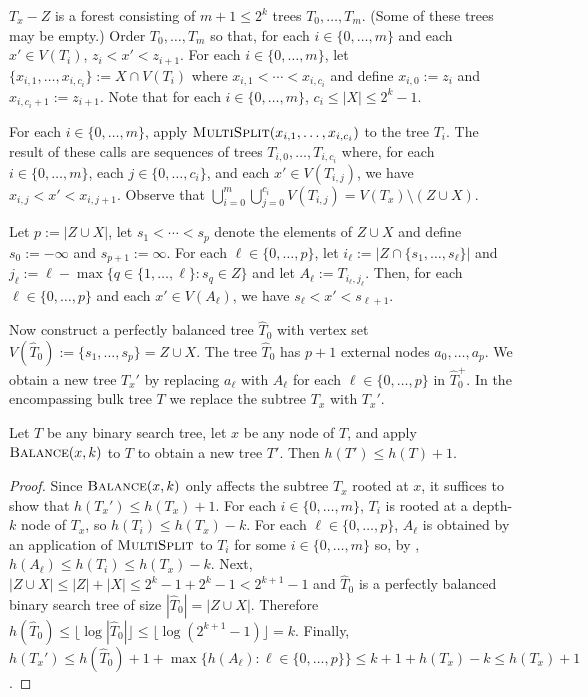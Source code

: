 \documentclass[kpfonts]{patmorin}
\let\le\leqslant
\begin{document}
$T_x-Z$ is a forest consisting of $m+1\le 2^{k}$ trees $T_0,\ldots,T_m$. (Some of these trees may be empty.)  Order $T_{0},\ldots,T_m$ so that, for each $i\in\{0,\ldots,m\}$ and each $x'\in V(T_i)$, $z_i< x' < z_{i+1}$.  For each $i\in\{0,\ldots,m\}$, let $\{x_{i,1},\ldots,x_{i,c_i}\}:=X\cap V(T_i)$ where $x_{i,1}<\cdots<x_{i,c_i}$ and define $x_{i,0}:=z_i$ and $x_{i,c_i+1}:=z_{i+1}$. Note that for each $i\in\{0,\ldots,m\}$, $c_i\le |X|\le 2^k-1$.

For each $i\in\{0,\ldots,m\}$, apply $\textsc{MultiSplit}(x_{i,1},\ldots,x_{i,c_i})$ to the tree $T_i$.  The result of these calls are sequences of trees $T_{i,0},\ldots,T_{i,c_i}$ where, for each $i\in\{0,\ldots,m\}$, each $j\in\{0,\ldots,c_i\}$, and each $x'\in V(T_{i,j})$, we have $x_{i,j}<x'<x_{i,j+1}$.  Observe that $\bigcup_{i=0}^m\bigcup_{j=0}^{c_i} V(T_{i,j}) = V(T_x)\setminus (Z\cup X)$.

Let $p:=|Z\cup X|$, let $s_1<\cdots< s_p$ denote the elements of $Z\cup X$ and define $s_0:=-\infty$ and $s_{p+1}:=\infty$.  For each $\ell\in\{0,\ldots,p\}$, let $i_\ell:=|Z\cap \{s_1,\ldots,s_\ell\}|$ and $j_\ell:= \ell - \max\{ q\in\{1,\ldots,\ell\}: s_q\in Z\}$ and let $A_\ell:=T_{i_\ell,j_\ell}$.   Then, for each $\ell\in \{0,\ldots,p\}$ and each $x'\in V(A_\ell)$, we have $s_\ell < x' < s_{\ell+1}$.

Now construct a perfectly balanced tree $\hat{T}_0$ with vertex set $V(\hat{T}_0):=\{s_1,\ldots,s_p\}=Z\cup X$.  The tree $\hat{T}_0$ has $p+1$ external nodes $a_0,\ldots,a_p$.  We obtain a new tree $T_x'$ by replacing $a_\ell$ with $A_\ell$ for each $\ell\in\{0,\ldots,p\}$ in $\hat{T}_0^+$.  In the encompassing bulk tree $T$ we replace the subtree $T_x$ with $T_x'$.

\begin{lem}
  Let $T$ be any binary search tree, let $x$ be any node of $T$, and apply $\textsc{Balance}(x,k)$ to $T$ to obtain a new tree $T'$.  Then $h(T')\le h(T)+1$.
\end{lem}

\begin{proof}
  Since $\textsc{Balance}(x,k)$ only affects the subtree $T_x$ rooted at $x$, it suffices to show that $h(T_x')\le h(T_x)+1$.  For each $i\in\{0,\ldots, m\}$, $T_i$ is rooted at a depth-$k$ node of $T_x$, so $h(T_i)\le h(T_x)-k$. For each $\ell \in\{0,\ldots,p\}$, $A_\ell$ is obtained by an application of $\textsc{MultiSplit}$ to $T_i$ for some $i\in\{0,\ldots,m\}$ so, by , $h(A_\ell)\le h(T_i)\le h(T_x)-k$.  Next, $|Z\cup X|\le |Z|+|X| \le 2^k-1 + 2^k-1 < 2^{k+1}-1$ and $\hat{T}_0$ is a perfectly balanced binary search tree of size $|\hat{T}_0|=|Z\cup X|$.  Therefore $h(\hat{T}_0)\le \lfloor\log|\hat{T}_0|\rfloor\le \lfloor\log(2^{k+1}-1)\rfloor = k$.  Finally, $h(T_x')\le h(\hat{T}_0)+1 +\max \{h(A_\ell):\ell\in\{0,\ldots,p\}\} \le k +1 + h(T_x) - k\le h(T_x)+1$.
\end{proof}
\end{document}
